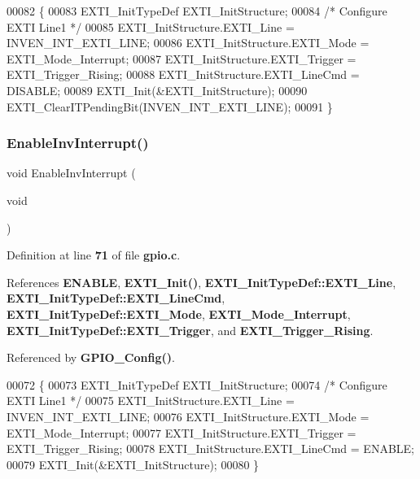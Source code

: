 \begin{DoxyCode}
00082 \{
00083   EXTI_InitTypeDef   EXTI\_InitStructure;
00084     \textcolor{comment}{/* Configure EXTI Line1 */}
00085   EXTI\_InitStructure.EXTI_Line = INVEN_INT_EXTI_LINE;
00086   EXTI\_InitStructure.EXTI_Mode = EXTI_Mode_Interrupt;
00087   EXTI\_InitStructure.EXTI_Trigger = EXTI_Trigger_Rising;
00088   EXTI\_InitStructure.EXTI_LineCmd = DISABLE;
00089   EXTI_Init(&EXTI\_InitStructure);
00090   EXTI_ClearITPendingBit(INVEN_INT_EXTI_LINE);
00091 \}
\end{DoxyCode}
\mbox{\label{gpio_8h_ac956352ee6a2cc7b303eeec6bea6ee59}} 
\subsubsection{Enable\+Inv\+Interrupt()}
{\footnotesize\ttfamily void Enable\+Inv\+Interrupt (\begin{DoxyParamCaption}\item[{void}]{ }\end{DoxyParamCaption})}



Definition at line \textbf{ 71} of file \textbf{ gpio.\+c}.



References \textbf{ E\+N\+A\+B\+LE}, \textbf{ E\+X\+T\+I\+\_\+\+Init()}, \textbf{ E\+X\+T\+I\+\_\+\+Init\+Type\+Def\+::\+E\+X\+T\+I\+\_\+\+Line}, \textbf{ E\+X\+T\+I\+\_\+\+Init\+Type\+Def\+::\+E\+X\+T\+I\+\_\+\+Line\+Cmd}, \textbf{ E\+X\+T\+I\+\_\+\+Init\+Type\+Def\+::\+E\+X\+T\+I\+\_\+\+Mode}, \textbf{ E\+X\+T\+I\+\_\+\+Mode\+\_\+\+Interrupt}, \textbf{ E\+X\+T\+I\+\_\+\+Init\+Type\+Def\+::\+E\+X\+T\+I\+\_\+\+Trigger}, and \textbf{ E\+X\+T\+I\+\_\+\+Trigger\+\_\+\+Rising}.



Referenced by \textbf{ G\+P\+I\+O\+\_\+\+Config()}.


\begin{DoxyCode}
00072 \{
00073   EXTI_InitTypeDef   EXTI\_InitStructure;
00074   \textcolor{comment}{/* Configure EXTI Line1 */}
00075   EXTI\_InitStructure.EXTI_Line = INVEN_INT_EXTI_LINE;
00076   EXTI\_InitStructure.EXTI_Mode = EXTI_Mode_Interrupt;
00077   EXTI\_InitStructure.EXTI_Trigger = EXTI_Trigger_Rising;
00078   EXTI\_InitStructure.EXTI_LineCmd = ENABLE;
00079   EXTI_Init(&EXTI\_InitStructure);
00080 \}
\end{DoxyCode}
\mbox{\label{gpio_8h_a56c8ff165146f2f845a0bf90e3eacd39}} 
